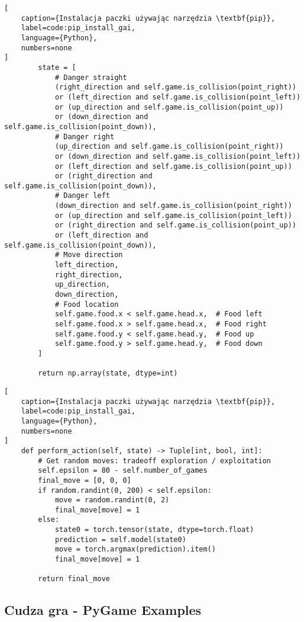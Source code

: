 \begin{onepage}
    \begin{lstlisting}[
    caption={Instalacja paczki używając narzędzia \textbf{pip}},
    label=code:pip_install_gai,
    language={Python},
    numbers=none
]
        state = [
            # Danger straight
            (right_direction and self.game.is_collision(point_right))
            or (left_direction and self.game.is_collision(point_left))
            or (up_direction and self.game.is_collision(point_up))
            or (down_direction and self.game.is_collision(point_down)),
            # Danger right
            (up_direction and self.game.is_collision(point_right))
            or (down_direction and self.game.is_collision(point_left))
            or (left_direction and self.game.is_collision(point_up))
            or (right_direction and self.game.is_collision(point_down)),
            # Danger left
            (down_direction and self.game.is_collision(point_right))
            or (up_direction and self.game.is_collision(point_left))
            or (right_direction and self.game.is_collision(point_up))
            or (left_direction and self.game.is_collision(point_down)),
            # Move direction
            left_direction,
            right_direction,
            up_direction,
            down_direction,
            # Food location
            self.game.food.x < self.game.head.x,  # Food left
            self.game.food.x > self.game.head.x,  # Food right
            self.game.food.y < self.game.head.y,  # Food up
            self.game.food.y > self.game.head.y,  # Food down
        ]

        return np.array(state, dtype=int)
    \end{lstlisting}
\end{onepage}
\begin{onepage}
    \begin{lstlisting}[
    caption={Instalacja paczki używając narzędzia \textbf{pip}},
    label=code:pip_install_gai,
    language={Python},
    numbers=none
]
    def perform_action(self, state) -> Tuple[int, bool, int]:
        # Get random moves: tradeoff exploration / exploitation
        self.epsilon = 80 - self.number_of_games
        final_move = [0, 0, 0]
        if random.randint(0, 200) < self.epsilon:
            move = random.randint(0, 2)
            final_move[move] = 1
        else:
            state0 = torch.tensor(state, dtype=torch.float)
            prediction = self.model(state0)
            move = torch.argmax(prediction).item()
            final_move[move] = 1

        return final_move

    \end{lstlisting}
\end{onepage}
\subsection{Cudza gra - PyGame Examples}
